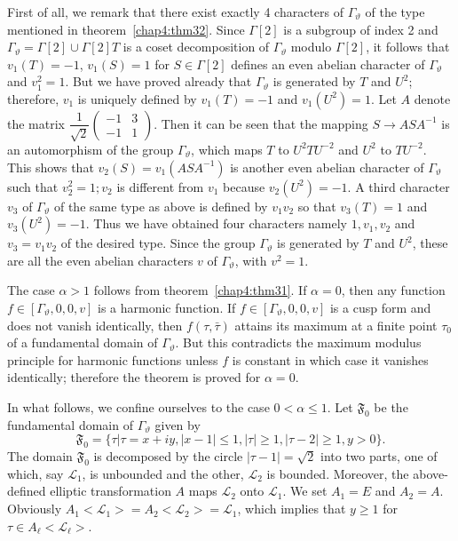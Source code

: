 First of all, we remark that there exist exactly 4 characters of
$\Gamma_{\vartheta}$ of the type mentioned in theorem~\ref{chap4:thm32}. Since
$\Gamma[2]$ is a subgroup of index 2 and
$\Gamma_{\vartheta}=\Gamma[2]\cup\Gamma[2]T$ is a coset decomposition
of $\Gamma_{\vartheta}$ modulo $\Gamma[2]$, it follows that
$v_1(T)=-1$, $v_1(S)=1$ for $S\in\Gamma[2]$ defines an
\pageoriginale even abelian character of $\Gamma_{\vartheta}$ and
$v^2_1=1$. But we have proved already that $\Gamma_{\vartheta}$ is
generated by $T$ and $U^2$; therefore, $v_1$ is uniquely defined by
$v_1(T)=-1$ and $v_1(U^2)=1$. Let $A$ denote the matrix
$\dfrac{1}{\sqrt{2}} \left(\begin{smallmatrix} -1 &3\\
-1& 1\end{smallmatrix}\right)$. Then it can be seen that the mapping
$S\to ASA^{-1}$ is an automorphism of the group $\Gamma_{\vartheta}$,
which maps $T$ to $U^2TU^{-2}$ and $U^2$ to $TU^{-2}$. This shows that
$v_2(S)=v_1(ASA^{-1})$ is another even abelian character of
$\Gamma_{\vartheta}$ such that $v^2_2=1;v_2$ is different from $v_1$
because $v_2(U^2)=-1$. A third character $v_3$ of $\Gamma_{\vartheta}$
of the same type as above is defined by $v_1v_2$ so that $v_3(T)=1$
and $v_3(U^2)=-1$. Thus we have obtained four characters namely
$1,v_1,v_2$ and $v_3=v_1v_2$ of the desired type. Since the group
$\Gamma_{\vartheta}$ is generated by $T$ and $U^2$, these are all the
even abelian characters $v$ of $\Gamma_{\vartheta}$, with $v^2=1$.

\setcounter{proofofthm}{31}
\begin{proofofthm}\label{chap4:prfthm32}
The case $\alpha>1$ follows from theorem~\ref{chap4:thm31}. If $\alpha=0$, then any
function $f\in [\Gamma_{\vartheta},0,0,v]$ is a harmonic
function. If $f\in [\Gamma_{\vartheta},0,0,v]$ is a cusp form
and does not vanish identically, then $f(\tau,\bar{\tau})$ attains its
maximum at a finite point $\tau_0$ of a fundamental domain of
$\Gamma_{\vartheta}$. But this contradicts the maximum modulus
principle for harmonic functions unless $f$ is constant in which case
it vanishes identically; therefore the theorem is proved for
$\alpha=0$.
\end{proofofthm}

In what follows, we confine ourselves to the case $0<\alpha\leq
1$. Let $\mathfrak{F}_0$ be the fundamental domain of
$\Gamma_{\vartheta}$ given by
$$
\mathfrak{F}_0 = \{\tau|\tau=x+iy, |x-1| \leq 1, |\tau| \geq 1,
|\tau-2| \geq 1, y >0\}.
$$
The domain $\mathfrak{F}_0$ is decomposed by the circle
$|\tau-1|=\sqrt{2}$ into two parts, one of which, say $\mathscr{L}_1$,
is unbounded and the other, $\mathscr{L}_2$ is bounded. Moreover, the
above-defined \pageoriginale elliptic transformation $A$ maps
$\mathscr{L}_2$ onto $\mathscr{L}_1$. We set $A_1=E$ and
$A_2=A$. Obviously
$A_1<\mathscr{L}_1>=A_2<\mathscr{L}_2>=\mathscr{L}_1$, which implies
that $y\geq 1$ for $\tau\in A_{\ell} <\mathscr{L}_{\ell}>$. 

